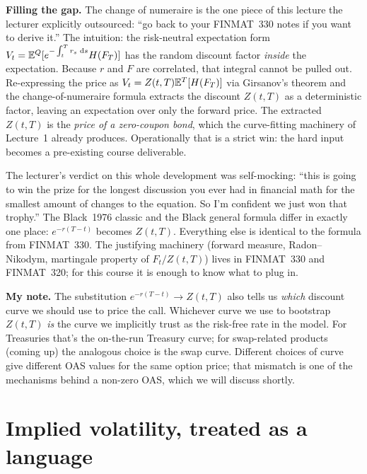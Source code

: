 \begin{tipblock}
\textbf{Filling the gap.} The change of numeraire is the one piece of
this lecture the lecturer explicitly outsourced: ``go back to your
FINMAT~330 notes if you want to derive it.'' The intuition: the
risk-neutral expectation form $V_t = \mathbb{E}^Q[e^{-\int_t^T r_s\,\,\mathrm{d} s}
H(F_T)]$ has the random discount factor \emph{inside} the expectation.
Because $r$ and $F$ are correlated, that integral cannot be pulled
out. Re-expressing the price as $V_t = Z(t,T) \mathbb{E}^T[H(F_T)]$ via
Girsanov's theorem and the change-of-numeraire formula extracts the
discount $Z(t,T)$ as a deterministic factor, leaving an expectation
over only the forward price. The extracted $Z(t,T)$ is the
\emph{price of a zero-coupon bond}, which the curve-fitting machinery
of Lecture~1 already produces. Operationally that is a strict win: the
hard input becomes a pre-existing course deliverable.
\end{tipblock}

The lecturer's verdict on this whole development was self-mocking:
``this is going to win the prize for the longest discussion you ever
had in financial math for the smallest amount of changes to the
equation. So I'm confident we just won that trophy.'' The Black~1976
classic and the Black general formula differ in exactly one place:
$e^{-r(T-t)}$ becomes $Z(t,T)$. Everything else is identical to the
formula from FINMAT~330. The justifying machinery (forward measure,
Radon--Nikodym, martingale property of $F_t/Z(t,T)$) lives in
FINMAT~330 and FINMAT~320; for this course it is enough to know what
to plug in.

\begin{checkpoint}
\textbf{My note.} The substitution $e^{-r(T-t)} \to Z(t,T)$ also tells
us \emph{which} discount curve we should use to price the call.
Whichever curve we use to bootstrap $Z(t,T)$ \emph{is} the curve we
implicitly trust as the risk-free rate in the model. For Treasuries
that's the on-the-run Treasury curve; for swap-related products
(coming up) the analogous choice is the swap curve. Different choices
of curve give different OAS values for the same option price; that
mismatch is one of the mechanisms behind a non-zero OAS, which we will
discuss shortly.
\end{checkpoint}

\section{Implied volatility, treated as a language}\label{L5-sec:ivol}

